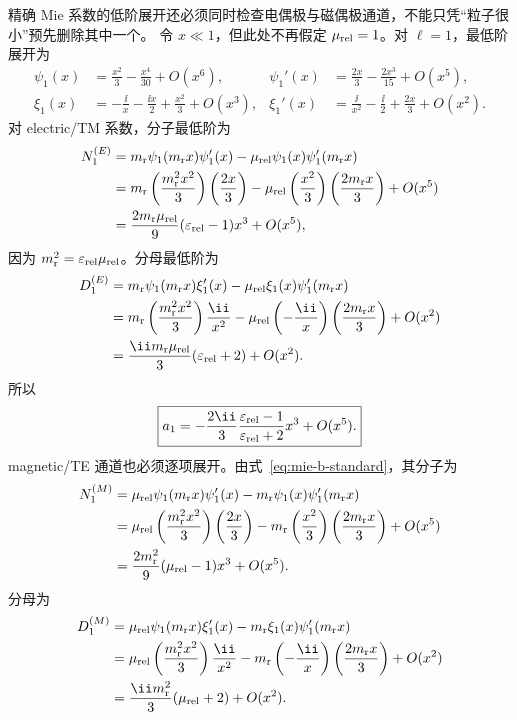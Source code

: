 精确 Mie 系数的低阶展开还必须同时检查电偶极与磁偶极通道，不能只凭“粒子很小”预先删除其中一个。
令
$x\ll1$，但此处不再假定 $\mu_{\rm rel}=1$。对 $\ell=1$，最低阶展开为
\begin{align}
\psi_1(x)
&=\frac{x^2}{3}-\frac{x^4}{30}+O(x^6),
&
\psi_1'(x)
&=\frac{2x}{3}-\frac{2x^3}{15}+O(x^5),
\\
\xi_1(x)
&=-\frac{\ii}{x}-\frac{\ii x}{2}
+\frac{x^2}{3}+O(x^3),
&
\xi_1'(x)
&=\frac{\ii}{x^2}-\frac{\ii}{2}
+\frac{2x}{3}+O(x^2).
\end{align}
对 electric/TM 系数，分子最低阶为
\begin{align}
N_1^{(E)}
&=m_{\rm r}\psi_1(m_{\rm r}x)\psi_1'(x)
-\mu_{\rm rel}\psi_1(x)\psi_1'(m_{\rm r}x)
\\
&=m_{\rm r}
\left(\frac{m_{\rm r}^2x^2}{3}\right)
\left(\frac{2x}{3}\right)
-\mu_{\rm rel}
\left(\frac{x^2}{3}\right)
\left(\frac{2m_{\rm r}x}{3}\right)
+O(x^5)
\\
&=\frac{2m_{\rm r}\mu_{\rm rel}}{9}
(\varepsilon_{\rm rel}-1)x^3+O(x^5),
\end{align}
因为 $m_{\rm r}^2=\varepsilon_{\rm rel}\mu_{\rm rel}$。分母最低阶为
\begin{align}
D_1^{(E)}
&=m_{\rm r}\psi_1(m_{\rm r}x)\xi_1'(x)
-\mu_{\rm rel}\xi_1(x)\psi_1'(m_{\rm r}x)
\\
&=m_{\rm r}
\left(\frac{m_{\rm r}^2x^2}{3}\right)
\frac{\ii}{x^2}
-\mu_{\rm rel}
\left(-\frac{\ii}{x}\right)
\left(\frac{2m_{\rm r}x}{3}\right)
+O(x^2)
\\
&=\frac{\ii m_{\rm r}\mu_{\rm rel}}{3}
(\varepsilon_{\rm rel}+2)+O(x^2).
\end{align}
所以
\begin{equation}
\boxed{
a_1
=-\frac{2\ii}{3}
\frac{\varepsilon_{\rm rel}-1}
{\varepsilon_{\rm rel}+2}x^3
+O(x^5).}
\label{eq:mie-rayleigh-a-general}
\end{equation}
magnetic/TE 通道也必须逐项展开。由式~\eqref{eq:mie-b-standard}，其分子为
\begin{align}
N_1^{(M)}
&=\mu_{\rm rel}\psi_1(m_{\rm r}x)\psi_1'(x)
-m_{\rm r}\psi_1(x)\psi_1'(m_{\rm r}x)\\
&=\mu_{\rm rel}
\left(\frac{m_{\rm r}^2x^2}{3}\right)
\left(\frac{2x}{3}\right)
-m_{\rm r}
\left(\frac{x^2}{3}\right)
\left(\frac{2m_{\rm r}x}{3}\right)
+O(x^5)\\
&=\frac{2m_{\rm r}^2}{9}(\mu_{\rm rel}-1)x^3+O(x^5).
\end{align}
分母为
\begin{align}
D_1^{(M)}
&=\mu_{\rm rel}\psi_1(m_{\rm r}x)\xi_1'(x)
-m_{\rm r}\xi_1(x)\psi_1'(m_{\rm r}x)\\
&=\mu_{\rm rel}
\left(\frac{m_{\rm r}^2x^2}{3}\right)
\frac{\ii}{x^2}
-m_{\rm r}
\left(-\frac{\ii}{x}\right)
\left(\frac{2m_{\rm r}x}{3}\right)
+O(x^2)\\
&=\frac{\ii m_{\rm r}^2}{3}(\mu_{\rm rel}+2)+O(x^2).
\end{align}
